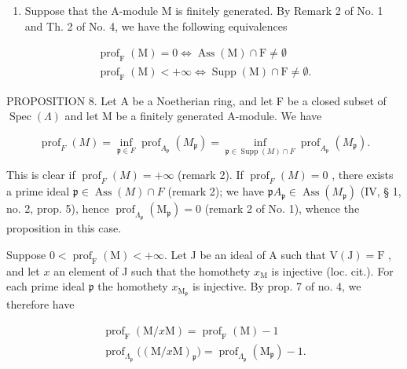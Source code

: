 \begin{enumerate}
\def\labelenumi{\arabic{enumi})}
\setcounter{enumi}{1}
\tightlist
\item
  Suppose that the A-module M is finitely generated. By Remark 2 of No. 1 and Th. 2 of No. 4, we have the following equivalences
\end{enumerate}

\[
\begin{array}{c} \operatorname{prof} _ {\mathrm{F}} (\mathrm{M}) = 0 \Longleftrightarrow \operatorname{Ass} (\mathrm{M}) \cap \mathrm{F} \neq \emptyset \\ \operatorname{prof} _ {\mathrm{F}} (\mathrm{M}) <   + \infty \Longleftrightarrow \operatorname{Supp} (\mathrm{M}) \cap \mathrm{F} \neq \emptyset . \end{array}
\]

PROPOSITION 8. Let A be a Noetherian ring, and let F be a closed subset of \(\operatorname{Spec}(\Lambda)\) and let M be a finitely generated A-module. We have

\[
\operatorname{prof} _ {F} (M) = \inf _ {\mathfrak {p} \in F} \operatorname{prof} _ {A _ {\mathfrak {p}}} \left(M _ {\mathfrak {p}}\right) = \inf _ {\mathfrak {p} \in \operatorname{Supp} (M) \cap F} \operatorname{prof} _ {A _ {\mathfrak {p}}} \left(M _ {\mathfrak {p}}\right).
\]

This is clear if \(\operatorname{prof}_{F}(M) = +\infty\) (remark 2). If \(\operatorname{prof}_{F}(M) = 0\) , there exists a prime ideal \(\mathfrak{p} \in \operatorname{Ass}(M) \cap F\) (remark 2); we have \(\mathfrak{p}A_{\mathfrak{p}} \in \operatorname{Ass}(M_{\mathfrak{p}})\) (IV, § 1, no. 2, prop. 5), hence \(\operatorname{prof}_{\Lambda_{\mathfrak{p}}}(\mathrm{M}_{\mathfrak{p}}) = 0\) (remark 2 of No. 1), whence the proposition in this case.

Suppose \(0 < \operatorname{prof}_{\mathrm{F}}(\mathrm{M}) < +\infty\). Let J be an ideal of A such that \(\mathrm{V}(\mathrm{J}) = \mathrm{F}\) , and let \(x\) an element of J such that the homothety \(x_{\mathrm{M}}\) is injective (loc. cit.). For each prime ideal \(\mathfrak{p}\) the homothety \(x_{\mathrm{M}_{\mathfrak{p}}}\) is injective. By prop. 7 of no. 4, we therefore have

\[
\begin{array}{c} \operatorname{prof} _ {\mathrm{F}} (\mathrm{M} / x \mathrm{M}) = \operatorname{prof} _ {\mathrm{F}} (\mathrm{M}) - 1 \\ \operatorname{prof} _ {\Lambda_ {\mathfrak {p}}} \big ((\mathrm{M} / x \mathrm{M}) _ {\mathfrak {p}} \big) = \operatorname{prof} _ {\Lambda_ {\mathfrak {p}}} (\mathrm{M} _ {\mathfrak {p}}) - 1. \end{array}
\]

